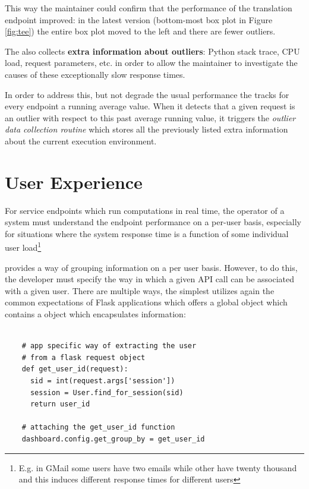 \documentclass[conference]{IEEEtran}
\begin{document}
  This way the maintainer could confirm that the performance of the translation endpoint improved: in the latest version (bottom-most box plot in Figure \ref{fig:tee}) the entire box plot moved to the left and there are fewer outliers.


  \niceseparator

  The \tool also collects {\bf extra information about outliers}: Python stack trace, CPU load, request parameters, etc. in order to allow the maintainer to investigate the causes of these exceptionally slow response times. 

  In order to address this, but not degrade the usual performance the \tool tracks for every endpoint a running average value. When it detects that a given request is an outlier with respect to this past average running value, it triggers the {\em outlier data collection routine} which stores all the previously listed extra information about the current execution environment. 


\section {User Experience}
\label{sec:user}

  For service endpoints which run computations in real time, the operator of a system must understand the endpoint performance on a per-user basis, especially for situations where the system response time is a function of some individual user load\footnote{E.g. in GMail some users have two emails while other have twenty thousand and this induces different response times for different users}

  \tool provides a way of grouping information on a per user basis. However, to do this, the developer must specify the way in which a given API call can be associated with a given user. There are multiple ways, the simplest utilizes again the common expectations of Flask applications which offers a global  object which contains a  object which encapsulates information: 

  \begin{lstlisting}[float,caption=Simply define a custom app-specific function for user retrieval and pass it to the \tool to group information by user,style=custompython]
    
    # app specific way of extracting the user
    # from a flask request object    
    def get_user_id(request):
      sid = int(request.args['session'])
      session = User.find_for_session(sid)
      return user_id

    # attaching the get_user_id function
    dashboard.config.get_group_by = get_user_id

  \end{lstlisting}
\end{document}
